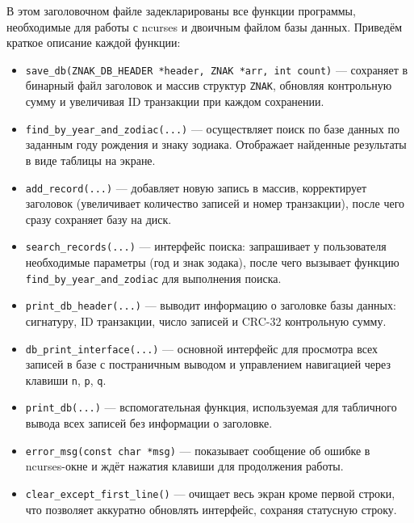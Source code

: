\noindent
В этом заголовочном файле задекларированы все функции программы, необходимые для работы с ncurses и двоичным файлом базы данных. Приведём краткое описание каждой функции:
\begin{itemize}
  \item \texttt{save\_db(ZNAK\_DB\_HEADER *header, ZNAK *arr, int count)} — сохраняет в бинарный файл заголовок и массив структур \texttt{ZNAK}, обновляя контрольную сумму и увеличивая ID транзакции при каждом сохранении.
  
  \item \texttt{find\_by\_year\_and\_zodiac(...)} — осуществляет поиск по базе данных по заданным году рождения и знаку зодиака. Отображает найденные результаты в виде таблицы на экране.
  
  \item \texttt{add\_record(...)} — добавляет новую запись в массив, корректирует заголовок (увеличивает количество записей и номер транзакции), после чего сразу сохраняет базу на диск.
  
  \item \texttt{search\_records(...)} — интерфейс поиска: запрашивает у пользователя необходимые параметры (год и знак зодака), после чего вызывает функцию \texttt{find\_by\_year\_and\_zodiac} для выполнения поиска.
  
  \item \texttt{print\_db\_header(...)} — выводит информацию о заголовке базы данных: сигнатуру, ID транзакции, число записей и CRC-32 контрольную сумму.
  
  \item \texttt{db\_print\_interface(...)} — основной интерфейс для просмотра всех записей в базе с постраничным выводом и управлением навигацией через клавиши \texttt{n}, \texttt{p}, \texttt{q}.
  
  \item \texttt{print\_db(...)} — вспомогательная функция, используемая для табличного вывода всех записей без информации о заголовке.
  
  \item \texttt{error\_msg(const char *msg)} — показывает сообщение об ошибке в ncurses-окне и ждёт нажатия клавиши для продолжения работы.
  
  \item \texttt{clear\_except\_first\_line()} — очищает весь экран кроме первой строки, что позволяет аккуратно обновлять интерфейс, сохраняя статусную строку.
\end{itemize}

